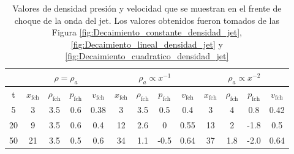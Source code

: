 \documentclass[12pt,a4paper]{book}
\begin{document}
\begin{table}[htbp]
  \begin{center}
  \begin{tabular}{|c|c|c|c|c|c|c|c|c|c|c|c|c|}
    \hline 
    & \multicolumn{4}{|c|}{$\rho = \rho_a$} & \multicolumn{4}{|c|}{$\rho_a \propto x^{-1}$} & \multicolumn{4}{|c|}{$\rho_a \propto x^{-2}$}\\
    \hline
    t & $x_{\text{fch}}$ & $\rho_{\text{fch}}$ & $p_{\text{fch}}$ & $v_{\text{fch}}$ & $x_{\text{fch}}$ & 
    $\rho_{\text{fch}}$ & $p_{\text{fch}}$ & $v_{\text{fch}}$ & $x_{\text{fch}}$ & $\rho_{\text{fch}}$ & $p_{\text{fch}}$ & 
    $v_{\text{fch}}$ \\
    \hline
     5 & 3  & 3.5 & 0.6 & 0.38    &  3  & 3.5 &  0.5  & 0.4     & 3  & 4   & 0.8  & 0.42 \\
    \hline
    20 & 9  & 3.5 & 0.6 & 0.4    &  12 & 2.6 &   0   & 0.55    & 13 & 2   & -1.8 & 0.5 \\
    \hline
    50 & 21 & 3.5 & 0.5 & 0.6    &  34 & 1.1 & -0.5  & 0.64     & 37 & 1.8 & -2.0 & 0.64 \\
    \hline

  \end{tabular}
  \caption{\label{Cuadro:valores_frente_choque} Valores de densidad presión y velocidad que se muestran en el frente
  de choque de la onda del jet. Los valores obtenidos fueron tomados de las Figura \ref{fig:Decaimiento_constante_densidad_jet},
  \ref{fig:Decaimiento_lineal_densidad_jet} y \ref{fig:Decaimiento_cuadratico_densidad_jet}}
  \end{center}
  \end{table}
\end{document}

